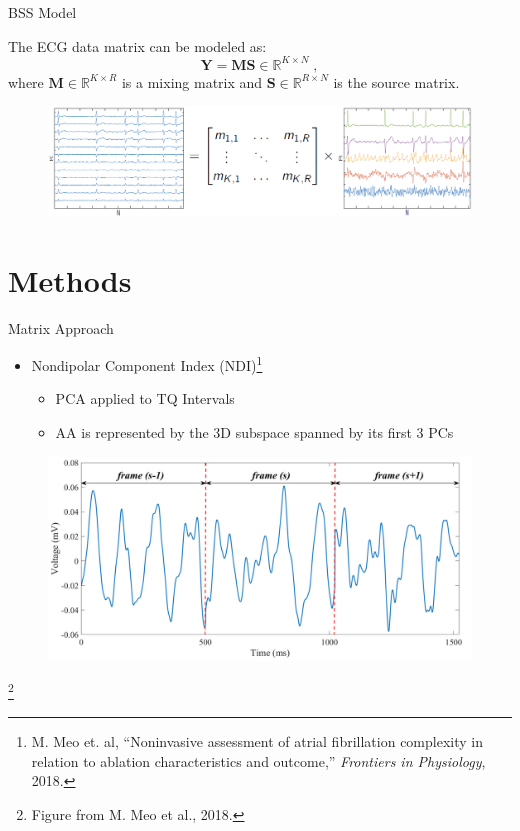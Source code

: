 \documentclass{beamer}
\newcommand\blfootnote[1]{%
   \begingroup
   \renewcommand\thefootnote{}\footnote{#1}%
   \addtocounter{footnote}{-1}%
   \endgroup
}
\begin{document}
	\begin{frame}{BSS Model}
	
		The ECG data matrix can be modeled as:
		\begin{equation}
			\textbf{Y} = \textbf{MS} \in \mathbb{R}^{K \times N} \; ,
		\end{equation}
		where ${\textbf{M}} \in {\mathbb{R}}^{K \times R}$ is a mixing matrix and $\textbf{S} \in {\mathbb{R}}^{R \times N}$ is the source matrix.	
		\begin{figure}[htb]
			\centering
			\includegraphics[scale=0.47]{figures/bss_fig.png}
		\end{figure}
	\end{frame}
		
\section{Methods}

	\begin{frame}{Matrix Approach}
		\begin{itemize}
			\item Nondipolar Component Index (NDI)\footnote{M. Meo et. al, ``Noninvasive assessment of atrial fibrillation complexity in relation to ablation characteristics and outcome,'' \textit{Frontiers in Physiology}, 2018.}
			\begin{itemize}
				\item PCA applied to TQ Intervals
				\item AA is represented by the 3D subspace spanned by its first 3 PCs
			\end{itemize}
		\end{itemize}
		\begin{figure}[htb]
			\centering
			\includegraphics[scale=0.17]{figures/MEO-NDI-TQ-Concatenation.png}
		\end{figure}
		\blfootnote{Figure from M. Meo et al., 2018.}
	\end{frame}
\end{document}
